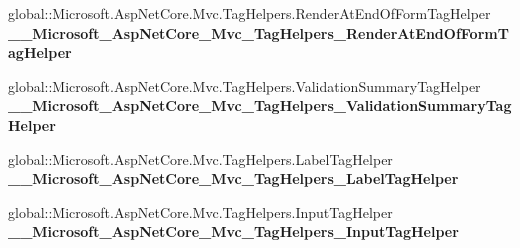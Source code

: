 \begin{DoxyCompactItemize}
\item 
\mbox{\label{class_projeto_e_s_w_1_1_areas_1_1_identity_1_1_pages_1_1_account_1_1_areas___identity___pages___account___register_a2605b4a1e369dba0f922010184523ca7}} 
global\+::\+Microsoft.\+Asp\+Net\+Core.\+Mvc.\+Tag\+Helpers.\+Render\+At\+End\+Of\+Form\+Tag\+Helper {\bfseries \+\_\+\+\_\+\+Microsoft\+\_\+\+Asp\+Net\+Core\+\_\+\+Mvc\+\_\+\+Tag\+Helpers\+\_\+\+Render\+At\+End\+Of\+Form\+Tag\+Helper}
\item 
\mbox{\label{class_projeto_e_s_w_1_1_areas_1_1_identity_1_1_pages_1_1_account_1_1_areas___identity___pages___account___register_a59237e5a5fd5bdf97ee7a40586915228}} 
global\+::\+Microsoft.\+Asp\+Net\+Core.\+Mvc.\+Tag\+Helpers.\+Validation\+Summary\+Tag\+Helper {\bfseries \+\_\+\+\_\+\+Microsoft\+\_\+\+Asp\+Net\+Core\+\_\+\+Mvc\+\_\+\+Tag\+Helpers\+\_\+\+Validation\+Summary\+Tag\+Helper}
\item 
\mbox{\label{class_projeto_e_s_w_1_1_areas_1_1_identity_1_1_pages_1_1_account_1_1_areas___identity___pages___account___register_a52db0fa751d9f2c8285feb0e7c8ecb35}} 
global\+::\+Microsoft.\+Asp\+Net\+Core.\+Mvc.\+Tag\+Helpers.\+Label\+Tag\+Helper {\bfseries \+\_\+\+\_\+\+Microsoft\+\_\+\+Asp\+Net\+Core\+\_\+\+Mvc\+\_\+\+Tag\+Helpers\+\_\+\+Label\+Tag\+Helper}
\item 
\mbox{\label{class_projeto_e_s_w_1_1_areas_1_1_identity_1_1_pages_1_1_account_1_1_areas___identity___pages___account___register_a05f23730be659703121fd7cce1c45ed9}} 
global\+::\+Microsoft.\+Asp\+Net\+Core.\+Mvc.\+Tag\+Helpers.\+Input\+Tag\+Helper {\bfseries \+\_\+\+\_\+\+Microsoft\+\_\+\+Asp\+Net\+Core\+\_\+\+Mvc\+\_\+\+Tag\+Helpers\+\_\+\+Input\+Tag\+Helper}
\item 
\mbox{\label{class_projeto_e_s_w_1_1_areas_1_1_identity_1_1_pages_1_1_account_1_1_areas___identity___pages___account___register_aefcd1add23a913078a5ad47d20ebb0fc}} 

\end{DoxyCompactItemize}
